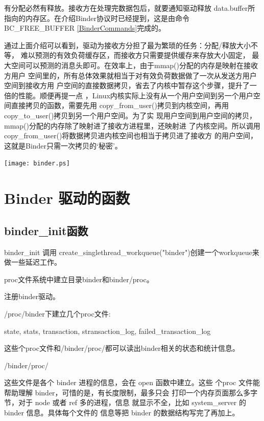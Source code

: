 \documentclass[a4paper,11pt]{article}
\begin{document}
有分配必然有释放。接收方在处理完数据包后，就要通知驱动释放
data.buffer所指向的内存区。在介绍Binder协议时已经提到，这是由命令
BC_FREE_BUFFER \ref{BinderCommands}完成的。

通过上面介绍可以看到，驱动为接收方分担了最为繁琐的任务：分配/释放大小不等，
难以预测的有效负荷缓存区，而接收方只需要提供缓存来存放大小固定，
最大空间可以预测的消息头即可。在效率上，由于mmap()分配的内存是映射在接收方用户
空间里的，所有总体效果就相当于对有效负荷数据做了一次从发送方用户空间到接收方用
户空间的直接数据拷贝，省去了内核中暂存这个步骤，提升了一倍的性能。顺便再提一点
，Linux内核实际上没有从一个用户空间到另一个用户空间直接拷贝的函数，需要先用
copy_from_user()拷贝到内核空间，再用copy_to_user()拷贝到另一个用户空间。为了实
现用户空间到用户空间的拷贝，mmap()分配的内存除了映射进了接收方进程里，还映射进
了内核空间。所以调用copy_from_user()将数据拷贝进内核空间也相当于拷贝进了接收方
的用户空间，这就是Binder只需一次拷贝的‘秘密’。

\texttt{[image: binder.ps]}

\section{Binder 驱动的函数}
\subsection{binder_init函数} 
\begin{itemize*}
    \item binder_init 调用 create_singlethread_workqueue("binder")创建一个workqueue来做一些延迟工作。
    \item proc文件系统中建立目录binder和binder/proc。
    \item 注册binder驱动。
    \item /proc/binder下建立几个proc文件:
        \begin{itemize*}
            \item state, stats, transaction, stransaction_log, failed_transaction_log

                这些个proc文件和/binder/proc/都可以读出binder相关的状态和统计信息。
            \item /binder/proc/

                 这些文件是各个 binder 进程的信息，会在 open 函数中建立。这些
                 个proc 文件能帮助理解 binder，可惜的是，有长度限制，最多只会
                 打印一个内存页面那么多字节，对于 node 或者 ref 多的进程，信息
                 就显示不全，比如 system_server 的 binder 信息。具体每个文件的
                 信息等把 binder 的数据结构写完了再加上。
        \end{itemize*}

\end{itemize*}
\end{document}
